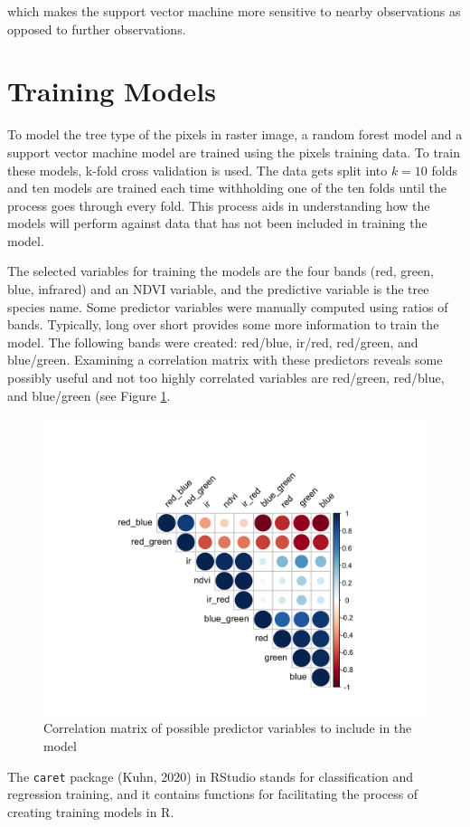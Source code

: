 \documentclass[12pt,twoside]{reedthesis}
\begin{document}
which makes the support vector machine more sensitive to nearby observations as opposed to further observations.

\hypertarget{training-models}{%
\section{Training Models}\label{training-models}}

To model the tree type of the pixels in raster image, a random forest model and a support vector machine model are trained using the pixels training data. To train these models, k-fold cross validation is used. The data gets split into \(k = 10\) folds and ten models are trained each time withholding one of the ten folds until the process goes through every fold. This process aids in understanding how the models will perform against data that has not been included in training the model.

The selected variables for training the models are the four bands (red, green, blue, infrared) and an NDVI variable, and the predictive variable is the tree species name. Some predictor variables were manually computed using ratios of bands. Typically, long over short provides some more information to train the model. The following bands were created: red/blue, ir/red, red/green, and blue/green. Examining a correlation matrix with these predictors reveals some possibly useful and not too highly correlated variables are red/green, red/blue, and blue/green (see Figure \ref{fig:corrmatrix}.
\begin{figure}

{\centering \includegraphics[width=0.4\linewidth]{figure/corrmatrix} 

}

\caption{Correlation matrix of possible predictor variables to include in the model}\label{fig:corrmatrix}
\end{figure}
The \texttt{caret} package (Kuhn, 2020) in RStudio stands for classification and regression training, and it contains functions for facilitating the process of creating training models in R.
\end{document}

